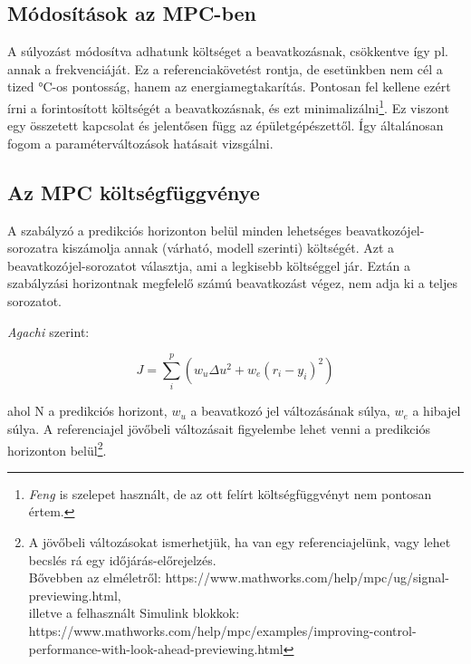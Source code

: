 \subsection{Módosítások az MPC-ben}

A súlyozást módosítva adhatunk költséget a beavatkozásnak, csökkentve így pl. annak a frekvenciáját. Ez a referenciakövetést rontja, de esetünkben nem cél a tized \si{\celsius}-os pontosság, hanem az energiamegtakarítás.
Pontosan fel kellene ezért írni a forintosított költségét a beavatkozásnak, és ezt minimalizálni\footnote{\textit{Feng \cite{FENG2015199}} is szelepet használt, de az ott felírt költségfüggvényt nem pontosan értem.}. Ez viszont egy összetett kapcsolat és jelentősen függ az épületgépészettől. Így általánosan fogom a paraméterváltozások hatásait vizsgálni.

\subsection{Az MPC költségfüggvénye}


A szabályzó a predikciós horizonton belül minden lehetséges beavatkozójel-sorozatra kiszámolja annak (várható, modell szerinti) költségét. Azt a beavatkozójel-sorozatot választja, ami a legkisebb költséggel jár. Eztán a szabályzási horizontnak megfelelő számú beavatkozást végez, nem adja ki a teljes sorozatot. 

\textit{Agachi \cite{romanMPC_Agachi}} szerint:

\begin{equation} \label{eq_mpc_cost}
J = \sum_{i}^{p} \left(w_u \Delta u^2 + w_e (r_i-y_i)^2  \right)
\end{equation}

ahol N a predikciós horizont, $w_u$ a beavatkozó jel változásának súlya, $w_e$ a hibajel súlya. A referenciajel jövőbeli változásait figyelembe lehet venni a predikciós horizonton belül\footnote{A jövőbeli változásokat ismerhetjük, ha van egy referenciajelünk, vagy lehet becslés rá egy időjárás-előrejelzés.\\Bővebben az elméletről: https://www.mathworks.com/help/mpc/ug/signal-previewing.html,\\illetve a felhasznált Simulink blokkok: https://www.mathworks.com/help/mpc/examples/improving-control-performance-with-look-ahead-previewing.html}.

